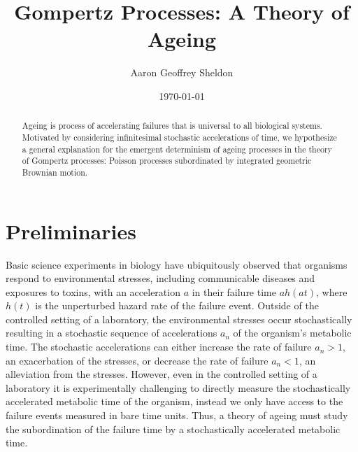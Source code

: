 \documentclass{article}
\title{Gompertz Processes: A Theory of Ageing}
\author{Aaron Geoffrey Sheldon}
\date{\today}
\theoremstyle{definition}\newtheorem{definition}{Definition}
\begin{document}
  \maketitle

  \begin{abstract}
    Ageing is process of accelerating failures that is universal to all biological systems.
    Motivated by considering infinitesimal stochastic accelerations of time, we hypothesize
    a general explanation for the emergent determinism of ageing processes in the theory of
    Gompertz processes: Poisson processes subordinated by integrated geometric Brownian
    motion.
  \end{abstract}

  \section{Preliminaries}
  Basic science experiments in biology have ubiquitously observed that organisms respond to
  environmental stresses, including communicable diseases and exposures to toxins, with an
  acceleration $a$ in their failure time $a h\left(a t\right)$, where $h\left(t\right)$ is
  the unperturbed hazard rate of the failure event. Outside of the controlled setting of a
  laboratory, the environmental stresses occur stochastically resulting in a stochastic
  sequence of accelerations $a_n$ of the organism's metabolic time. The stochastic
  accelerations can either increase the rate of failure $a_n > 1$, an exacerbation of the
  stresses, or decrease the rate of failure $a_n < 1$, an alleviation from the stresses.
  However, even in the controlled setting of a laboratory it is experimentally challenging
  to directly measure the stochastically accelerated metabolic time of the organism, instead
  we only have access to the failure events measured in bare time units. Thus, a theory of
  ageing must study the subordination of the failure time by a stochastically accelerated
  metabolic time.
\end{document}
